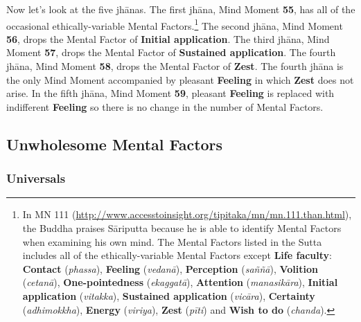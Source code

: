Now let’s look at the five jhānas. The first jhāna, Mind Moment \textbf{55}, has all of the occasional ethically-variable Mental Factors.\footnote{In MN 111 (\url{http://www.accesstoinsight.org/tipitaka/mn/mn.111.than.html}), the Buddha praises Sāriputta because he is able to identify Mental Factors when examining his own mind. The Mental Factors listed in the Sutta includes all of the ethically-variable Mental Factors except \textbf{Life faculty}: \textbf{Contact} (\textit{phassa}), \textbf{Feeling} (\textit{vedanā}), \textbf{Perception} (\textit{saññā}), \textbf{Volition} (\textit{cetanā}), \textbf{One-pointedness} (\textit{ekaggatā}), \textbf{Attention} (\textit{manasikāra}), \textbf{Initial application} (\textit{vitakka}), \textbf{Sustained application} (\textit{vicāra}), \textbf{Certainty} (\textit{adhimokkha}), \textbf{Energy} (\textit{viriya}), \textbf{Zest} (\textit{pīti}) and \textbf{Wish to do} (\textit{chanda}).} The second jhāna, Mind Moment \textbf{56}, drops the Mental Factor of \textbf{Initial application}. The third jhāna, Mind Moment \textbf{57}, drops the Mental Factor of \textbf{Sustained application}. The fourth jhāna, Mind Moment \textbf{58}, drops the Mental Factor of \textbf{Zest}. The fourth jhāna is the only Mind Moment accompanied by pleasant \textbf{Feeling} in which \textbf{Zest} does not arise. In the fifth jhāna, Mind Moment \textbf{59}, pleasant \textbf{Feeling} is replaced with indifferent \textbf{Feeling} so there is no change in the number of Mental Factors.

\subsection*{Unwholesome Mental Factors}

\subsubsection*{Universals}

